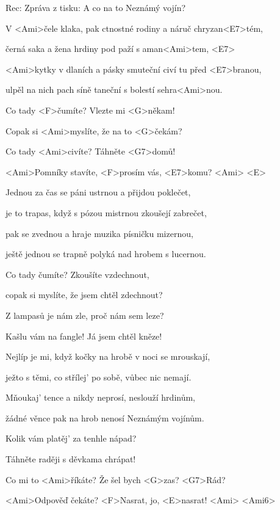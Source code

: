 

Rec: Zpráva z tisku:  A co na to Neznámý vojín?

\zs
V <Ami>čele klaka, pak ctnostné rodiny a náruč chryzan<E7>tém,

černá saka a žena hrdiny pod paží s aman<Ami>tem, <E7>

<Ami>kytky v dlaních a pásky smuteční civí tu před <E7>branou,

ulpěl na nich pach síně taneční s bolestí sehra<Ami>nou.
\ks

\zr
Co tady <F>čumíte? Vlezte mi <G>někam!

Copak si <Ami>myslíte, že na to <G>čekám?

Co tady <Ami>civíte? Táhněte <G7>domů!

<Ami>Pomníky stavíte, <F>prosím vás, <E7>komu? <Ami> <E>
\kr

\zs
Jednou za čas se páni ustrnou a přijdou poklečet,

je to trapas, když s pózou mistrnou zkoušejí zabrečet,

pak se zvednou a hraje muzika písničku mizernou,

ještě jednou se trapně polyká nad hrobem s lucernou.
\ks

\zr
Co tady čumíte? Zkoušíte vzdechnout,

copak si myslíte, že jsem chtěl zdechnout?

Z lampasů je nám zle, proč nám sem leze?

Kašlu vám na fangle! Já jsem chtěl kněze!
\kr

\zs
Nejlíp je mi, když kočky na hrobě v noci se mrouskají,

ježto s těmi, co střílej' po sobě, vůbec nic nemají.

Mňoukaj' tence a nikdy neprosí, neslouží hrdinům,

žádné věnce pak na hrob nenosí Neznámým vojínům.
\ks

\zr
Kolik vám platěj' za tenhle nápad?

Táhněte raději s děvkama chrápat!

Co mi to <Ami>říkáte? Že šel bych <G>zas? <G7>Rád?

<Ami>Odpověď čekáte? <F>Nasrat, jo, <E>nasrat! <Ami> <Ami6>
\kr

\kp
